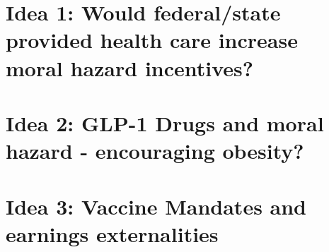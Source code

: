 

\section{Idea 1: Would federal/state provided health care increase moral hazard incentives?}
  

\section{Idea 2: GLP-1 Drugs and moral hazard - encouraging obesity?}


\section{Idea 3: Vaccine Mandates and earnings externalities}
